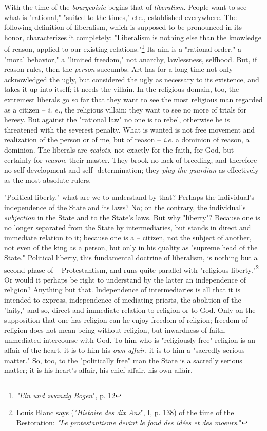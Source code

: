 \documentclass[a4paper]{book}
\begin{document}
With the time of the \textit{bourgeoisie} begins that of \textit{liberalism}. 
People want to see what is "{}rational,"{} "{}suited to the times,"{} etc., 
established everywhere. The following definition of liberalism, which is 
supposed to be pronounced in its honor, characterizes it completely: 
"{}Liberalism is nothing else than the knowledge of reason, applied to our 
existing relations."{}\footnote{\textit{"{}Ein und zwanzig Bogen}"{}, p. 12} 
Its aim is a "{}rational order,"{} a "{}moral behavior,"{} a "{}limited 
freedom,"{} not anarchy, lawlessness, selfhood. But, if reason rules, then the 
\textit{person} succumbs. Art has for a long time not only acknowledged the 
ugly, but considered the ugly as necessary to its existence, and takes it up 
into itself; it needs the villain. In the religious domain, too, the extremest 
liberals go so far that they want to see the most religious man regarded as a 
citizen -- \textit{i. e.}, the religious villain; they want to see no more of 
trials for heresy. But against the "{}rational law"{} no one is to rebel, 
otherwise he is threatened with the severest penalty. What is wanted is not 
free movement and realization of the person or of me, but of reason -- 
\textit{i.e.} a dominion of reason, a dominion. The liberals are 
\textit{zealots}, not exactly for the faith, for God, but certainly for 
\textit{reason}, their master. They brook no lack of breeding, and therefore 
no self-development and self- determination; they \textit{play the guardian} 
as effectively as the most absolute rulers.

"{}Political liberty,"{} what are we to understand by that? Perhaps the 
individual's independence of the State and its laws? No; on the contrary, the 
individual's \textit{subjection} in the State and to the State's laws. But why 
"{}liberty"{}? Because one is no longer separated from the State by 
intermediaries, but stands in direct and immediate relation to it; because one 
is a -- citizen, not the subject of another, not even of the king as a person, 
but only in his quality as "{}supreme head of the State."{} Political liberty, 
this fundamental doctrine of liberalism, is nothing but a second phase of -- 
Protestantism, and runs quite parallel with "{}religious 
liberty."{}\footnote{Louis Blanc says (\textit{"{}Histoire des dix Ans}"{}, I, 
p. 138) of the time of the Restoration: \textit{"{}Le protestantisme devint le 
fond des id\'ees et des moeurs}."{}} Or would it perhaps be right to 
understand by the latter an independence of religion? Anything but that. 
Independence of intermediaries is all that it is intended to express, 
independence of mediating priests, the abolition of the "{}laity,"{} and so, 
direct and immediate relation to religion or to God. Only on the supposition 
that one has religion can he enjoy freedom of religion; freedom of religion 
does not mean being without religion, but inwardness of faith, unmediated 
intercourse with God. To him who is "{}religiously free"{} religion is an 
affair of the heart, it is to him his \textit{own affair}, it is to him a 
"{}sacredly serious matter."{} So, too, to the "{}politically free"{} man the 
State is a sacredly serious matter; it is his heart's affair, his chief 
affair, his own affair.
\end{document}
